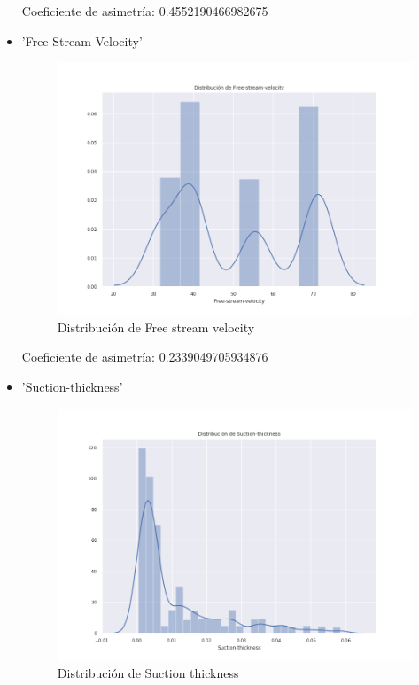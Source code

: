 \begin{itemize}
Coeficiente de asimetría: 0.4552190466982675

\item 'Free Stream Velocity'

\begin{figure}[H] %
	\centering
	\includegraphics[scale=0.45]{dist-fsv.png}  %
	\caption{Distribución de Free stream velocity} 
	\label{fig:dist-fsv}
\end{figure}

Coeficiente de asimetría: 0.2339049705934876

\item 'Suction-thickness'

\begin{figure}[H] %
	\centering
	\includegraphics[scale=0.45]{dist-st.png}  %
	\caption{Distribución de Suction thickness} 
	\label{fig:dist-st}
\end{figure}


\end{itemize}
